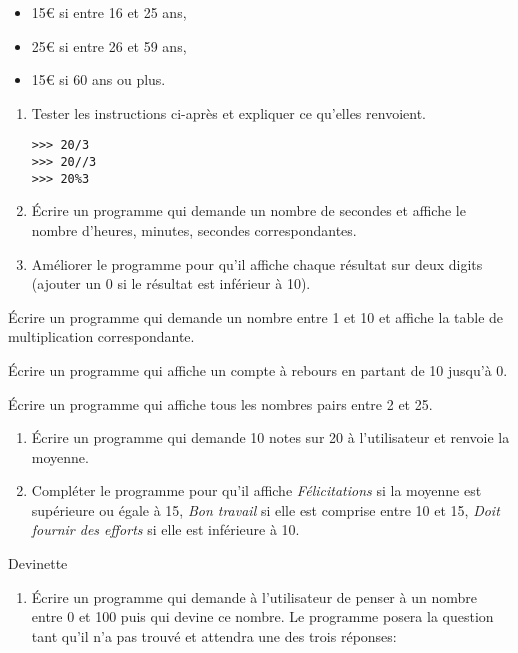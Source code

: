 \documentclass[a4paper,11pt]{article}
\begin{document}
\begin{Form}
\begin{exo}
\begin{itemize}
\item 15€ si entre 16 et 25 ans,
\item 25€ si entre 26 et 59 ans,
\item 15€ si 60 ans ou plus.
\end{itemize}
\end{exo}
\begin{exo}
\begin{enumerate}
\item Tester les instructions ci-après et expliquer ce qu'elles renvoient.
\begin{lstlisting}
>>> 20/3
>>> 20//3
>>> 20%3
\end{lstlisting}
\item Écrire un programme qui demande un nombre de secondes et affiche le nombre d'heures, minutes, secondes correspondantes.
\item Améliorer le programme pour qu'il affiche chaque résultat sur deux digits (ajouter un 0 si le résultat est inférieur à 10).
\end{enumerate}
\end{exo}
\begin{exo}
Écrire un programme qui demande un nombre entre 1 et 10 et affiche la table de multiplication correspondante.
\end{exo}
\begin{exo}
Écrire un programme qui affiche un compte à rebours en partant de 10 jusqu'à 0.
\end{exo}
\begin{exo}
Écrire un programme qui affiche tous les nombres pairs entre 2 et 25.
\end{exo}
\begin{exo}
\begin{enumerate}
\item Écrire un programme qui demande 10 notes sur 20 à l'utilisateur et renvoie la moyenne.
\item Compléter le programme pour qu'il affiche \emph{Félicitations} si la moyenne est supérieure ou égale à 15, \emph{Bon travail} si elle est comprise entre 10 et 15, \emph{Doit fournir des efforts} si elle est inférieure à 10.
\end{enumerate}
\end{exo}
\begin{exo}
Devinette
\begin{enumerate}
\item Écrire un programme qui demande à l'utilisateur de penser à un nombre entre 0 et 100 puis qui devine ce nombre. Le programme posera la question  tant qu'il n'a pas trouvé et attendra une des trois réponses:

\end{enumerate}
\end{exo}
\end{Form}
\end{document}
